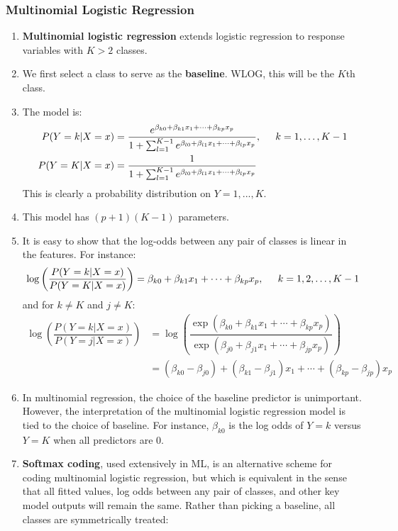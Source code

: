 \documentclass[10pt]{article}
\begin{document}
\subsubsection{Multinomial Logistic Regression} 
\begin{enumerate}
	\item \textbf{Multinomial logistic regression} extends logistic regression to response variables with $K > 2$ classes.
	\item We first select a class to serve as the \textbf{baseline}.  WLOG, this will be the $K$th class.
	\item The model is:
	\begin{align*}
		P(Y = k| X = x) &= \dfrac{e^{\beta_{k0} + \beta_{k1} x_1 + \dots + \beta_{kp}x_p}}{1 + \sum_{l = 1}^{K - 1} e^{\beta_{l0} + \beta_{l1}x_1 + \dots + \beta_{lp}x_p }}, \hspace{.2in} k = 1, \dots, K-1 \\
		P(Y = K| X = x) &= \dfrac{1}{1 + \sum_{l = 1}^{K - 1} e^{\beta_{l0} + \beta_{l1}x_1 + \dots + \beta_{lp}x_p }}
	\end{align*}
	This is clearly a probability distribution on $Y = 1, ..., K$. 
	\item This model has $(p + 1)(K - 1)$ parameters.
	\item It is easy to show that the log-odds between any pair of classes is linear in the features.  For instance: 
	\begin{align*}
		\log\left( \dfrac{P(Y = k| X  = x)}{P(Y = K| X = x )}\right) = \beta_{k0} + \beta_{k1}x_1 + \cdots + \beta_{kp}x_p, \hspace{.2in} k = 1, 2, \dots, K-1
	\end{align*}
	and for $k \neq K$ and $j \neq K$:
	\begin{align*}
		\log\left( \dfrac{P(Y = k| X  = x)}{P(Y = j| X = x )}\right) 
		&= \log\left(\dfrac{\exp(\beta_{k0} + \beta_{k1}x_1 + \cdots + \beta_{kp}x_p)}{\exp(\beta_{j0} + \beta_{j1}x_1 + \cdots + \beta_{jp}x_p)} \right) \\
		&= (\beta_{k0} - \beta_{j0}) + (\beta_{k1} - \beta_{j1})x_1 + \cdots + (\beta_{kp} - \beta_{jp}) x_p 
	\end{align*}
	\item In multinomial regression, the choice of the baseline predictor is unimportant.  However, the interpretation of the multinomial logistic regression model is tied to the choice of baseline.  For instance, $\beta_{k0}$ is the log odds of $Y = k$ versus $Y = K$ when all predictors are 0.
	\item \textbf{Softmax coding}, used extensively in ML, is an alternative scheme for coding multinomial logistic regression, but which is equivalent in the sense that all fitted values, log odds between any pair of classes, and other key model outputs will remain the same.  Rather than picking a baseline, all classes are symmetrically treated:

\end{enumerate}
\end{document}
